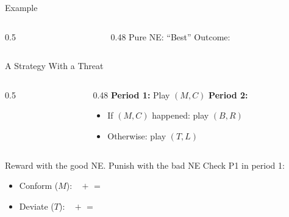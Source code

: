\begin{frame}{Example}
\begin{columns}[T]
\begin{column}{0.5\textwidth}
\centering
{}%
\end{column}
\begin{column}{0.48\textwidth}
Pure NE: \underline{\hspace{1.2in}}
\bsk
``Best'' Outcome: \underline{\hspace{0.8in}}
\bsk
{}
\end{column}
\end{columns}
\bsk
{}
\bsk
{}
\vspace{-0.3in}
\end{frame}

\begin{frame}{A Strategy With a Threat}
\begin{columns}[T]
\begin{column}{0.5\textwidth}
\centering
\stagegame
\end{column}
\begin{column}{0.48\textwidth}
\textbf{Period 1:} Play $(M,C)$
\bsk
\textbf{Period 2:}
\begin{itemize}
    \item If $(M,C)$ happened: play $(B,R)$
    \item Otherwise: play $(T,L)$
\end{itemize}
\end{column}
\end{columns}
\bsk
Reward with the good NE. Punish with the bad NE
\bsk
Check P1 in period 1:
\begin{itemize}
    \item Conform ($M$): \ \underline{\hspace{0.3in}} $+$ \underline{\hspace{0.3in}} $=$ \underline{\hspace{0.3in}}
    \item Deviate ($T$): \ \underline{\hspace{0.3in}} $+$ \underline{\hspace{0.3in}} $=$ \underline{\hspace{0.3in}}
\end{itemize}
\bsk
{}
\vspace{-0.3in}
\end{frame}

